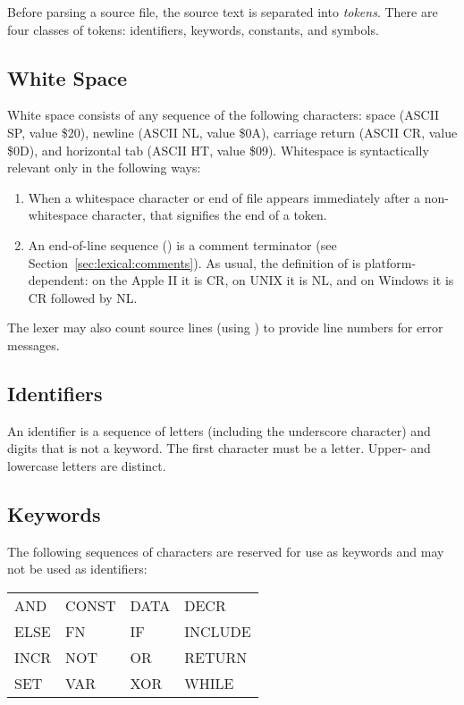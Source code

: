 \documentclass[10pt]{article}
\begin{document}
Before parsing a source file, the source text is separated into
\emph{tokens}.  There are four classes of tokens: identifiers,
keywords, constants, and symbols.

\subsection{White Space}
\label{sec:lexical:white-space}

White space consists of any sequence of the following characters:
space (ASCII SP, value \$20), newline (ASCII NL, value \$0A), carriage
return (ASCII CR, value \$0D), and horizontal tab (ASCII HT, value
\$09).  Whitespace is syntactically relevant only in the following
ways:
%
\begin{enumerate}
%
\item {} When a whitespace character or end of
file appears immediately after a non-whitespace character, that
signifies the end of a token.
%
\item {} An end-of-line sequence () is a
  comment terminator (see Section~\ref{sec:lexical:comments}).  As
  usual, the definition of  is platform-dependent: on the
  Apple II it is CR, on UNIX it is NL, and on Windows it is CR
  followed by NL.
%
\end{enumerate}
%
The lexer may also count source lines (using ) to provide
line numbers for error messages.

\subsection{Identifiers}\label{Identifiers}

An identifier is a sequence of letters (including the underscore
character) and digits that is not a keyword.  The first character must
be a letter.  Upper- and lowercase letters are distinct.

\subsection{Keywords}

The following sequences of characters are reserved for use as keywords
and may not be used as identifiers:
\begin{ttfamily}
\begin{center}
\begin{tabular}{l l l l}
AND & CONST & DATA & DECR \\
%
ELSE & FN & IF & INCLUDE \\
%
INCR & NOT & OR & RETURN \\
%
SET & VAR & XOR & WHILE \\
\end{tabular}
\end{center}
\end{ttfamily}
\end{document}
